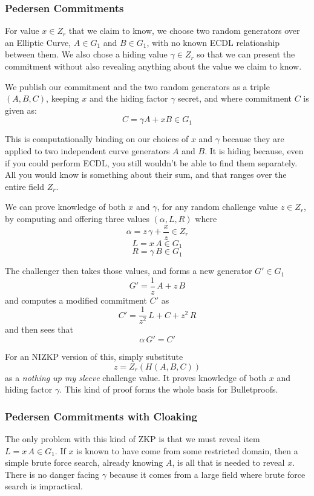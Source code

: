 \documentclass{yellowpaper}
\begin{document}
\subsubsection{Pedersen Commitments}
For value $x \in Z_r$ that we claim to know, we choose two random generators over an Elliptic Curve, $A \in G_1$ and $B \in G_1$, with no known ECDL relationship between them. We also chose a hiding value $\gamma \in Z_r$ so that we can present the commitment without also revealing anything about the value we claim to know.
 
We publish our commitment and the two random generators as a triple $(A, B, C)$, keeping $x$ and the hiding factor $\gamma$ secret, and where commitment $C$ is given as:
$$C = \gamma A + x B \in G_1$$

This is computationally binding on our choices of $x$ and $\gamma$ because they are applied to two independent curve generators $A$ and $B$. It is hiding because, even if you could perform ECDL, you still wouldn't be able to find them separately. All you would know is something about their sum, and that ranges over the entire field $Z_r$.

We can prove knowledge of both $x$ and $\gamma$, for any random challenge value $z \in Z_r$, by computing and offering three values $(\alpha, L, R)$ where
$$\alpha = z \, \gamma + \frac{x}{z} \in Z_r$$
$$L = x \, A \in G_1$$
$$R = \gamma \, B \in G_1$$

The challenger then takes those values, and forms a new generator $G' \in G_1$
$$G' = \frac{1}{z}\, A + z \, B$$
and computes a modified commitment $C'$ as
$$C' =  \frac{1}{z^2}\, L + C + z^2 \, R$$
and then sees that
$$ \alpha \, G' = C'$$

For an NIZKP version of this, simply substitute 
$$z = Z_r(H(A, B, C))$$ 
as a {\em{nothing up my sleeve}} challenge value. It proves knowledge of both $x$ and hiding factor $\gamma$. This kind of proof forms the whole basis for Bulletproofs. 

\subsubsection{Pedersen Commitments with Cloaking}
The only problem with this kind of ZKP is that we must reveal item $L =x \, A \in G_1$. If $x$ is known to have come from some restricted domain, then a simple brute force search, already knowing $A$, is all that is needed to reveal $x$. There is no danger facing $\gamma$ because it comes from a large field where brute force search is impractical.
\end{document}
